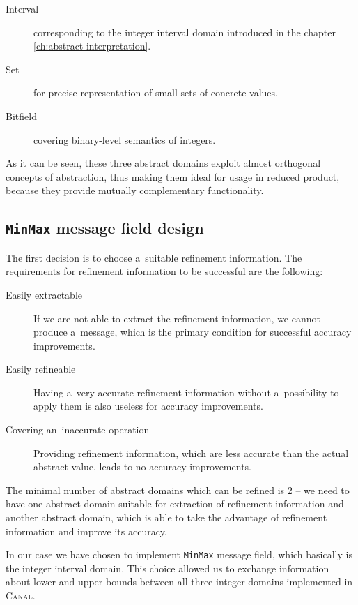 \documentclass[12pt,oneside]{fithesis2}
\theoremstyle{definition}
\begin{document}
\begin{description}
  \item[Interval] corresponding to the integer interval domain introduced in the chapter \ref{ch:abstract-interpretation}.
  \item[Set] for precise representation of small sets of concrete values.
  \item[Bitfield] covering binary-level semantics of integers.
\end{description}

As it can be seen, these three abstract domains exploit almost orthogonal concepts of abstraction, thus making them ideal for usage in reduced product, because they provide mutually complementary functionality.

\subsection{\texttt{MinMax} message field design}

The first decision is to choose a~suitable refinement information. The requirements for refinement information to be successful are the following:

\begin{description}
  \item[Easily extractable] If we are not able to extract the refinement information, we cannot produce a~message, which is the primary condition for successful accuracy improvements.
  \item[Easily refineable] Having a~very accurate refinement information without a~possibility to apply them is also useless for accuracy improvements.
  \item[Covering an~inaccurate operation] Providing refinement information, which are less accurate than the actual abstract value, leads to no accuracy improvements.
\end{description}

The minimal number of abstract domains which can be refined is 2 -- we need to have one abstract domain suitable for extraction of refinement information and another abstract domain, which is able to take the advantage of refinement information and improve its accuracy.

In our case we have chosen to implement \texttt{MinMax} message field, which basically is the integer interval domain. This choice allowed us to exchange information about lower and upper bounds between all three integer domains implemented in \textsc{Canal}.
\end{document}
